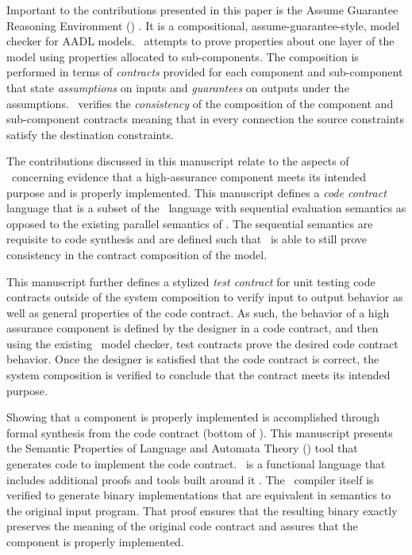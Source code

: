 Important to the contributions presented in this paper is the Assume Guarantee Reasoning Environment (\agr) \cite{compositional-analysis-agree,nfm:agree}. It is a compositional, assume-guarantee-style, model checker for AADL models. 
\agr\ attempts to prove properties about one layer of the model using properties allocated to sub-components.
The composition is performed in terms of \emph{contracts} provided for each component and sub-component that state \emph{assumptions} on inputs and \emph{guarantees} on outputs under the assumptions.
\agr\ verifies the \emph{consistency} of the composition of the component and sub-component contracts meaning that in every connection the source constraints satisfy the destination constraints.

The contributions discussed in this manuscript relate to the aspects of \brfcs\ concerning evidence that a high-assurance component meets its intended purpose and is properly implemented.
This manuscript defines a \emph{code contract} language that is a subset of the \agr\ language with sequential evaluation semantics as opposed to the existing parallel semantics of \agr.
The sequential semantics are requisite to code synthesis and are defined such that \agr\ is able to still prove consistency in the contract composition of the model. 

This manuscript further defines a stylized \emph{test contract} for unit testing code contracts outside of the system composition to verify input to output behavior as well as general properties of the code contract.
As such, the behavior of a high assurance component is defined by the designer in a code contract, and then using the existing \agr\ model checker, test contracts prove the desired code contract behavior.
Once the designer is satisfied that the code contract is correct, the system composition is verified to conclude that the contract meets its intended purpose.

Showing that a component is properly implemented is accomplished through formal synthesis from the code contract (bottom of ).
This manuscript presents the Semantic Properties of Language and Automata Theory (\splt) tool that generates \emph{\ckml} code to implement the code contract.
\ckml\ is a functional language that includes additional proofs and tools built around it \cite{cakeml}.
The \ckml\ compiler itself is verified to generate binary implementations that are equivalent in semantics to the original input program.
That proof ensures that the resulting binary exactly preserves the meaning of the original code contract and assures that the component is properly implemented.